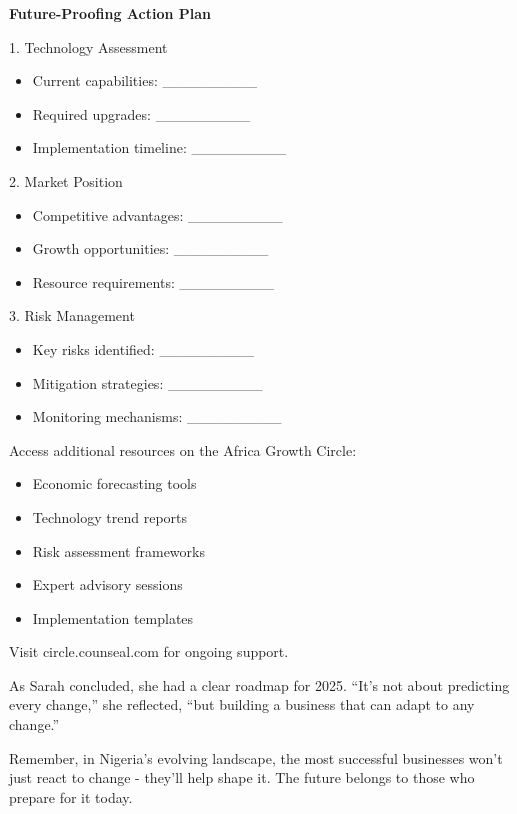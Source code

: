 \begin{workshopbox}
\textbf{Future-Proofing Action Plan}

1. Technology Assessment
\begin{itemize}
    \item Current capabilities: \_\_\_\_\_\_\_\_\_
    \item Required upgrades: \_\_\_\_\_\_\_\_\_
    \item Implementation timeline: \_\_\_\_\_\_\_\_\_
\end{itemize}

2. Market Position
\begin{itemize}
    \item Competitive advantages: \_\_\_\_\_\_\_\_\_
    \item Growth opportunities: \_\_\_\_\_\_\_\_\_
    \item Resource requirements: \_\_\_\_\_\_\_\_\_
\end{itemize}

3. Risk Management
\begin{itemize}
    \item Key risks identified: \_\_\_\_\_\_\_\_\_
    \item Mitigation strategies: \_\_\_\_\_\_\_\_\_
    \item Monitoring mechanisms: \_\_\_\_\_\_\_\_\_
\end{itemize}
\end{workshopbox}

\begin{communitybox}
Access additional resources on the Africa Growth Circle:
\begin{itemize}
    \item Economic forecasting tools
    \item Technology trend reports
    \item Risk assessment frameworks
    \item Expert advisory sessions
    \item Implementation templates
\end{itemize}
Visit circle.counseal.com for ongoing support.
\end{communitybox}

\begin{importantbox}
As Sarah concluded, she had a clear roadmap for 2025. ``It's not about predicting every change,'' she reflected, ``but building a business that can adapt to any change.''

Remember, in Nigeria's evolving landscape, the most successful businesses won't just react to change - they'll help shape it. The future belongs to those who prepare for it today.
\end{importantbox}
